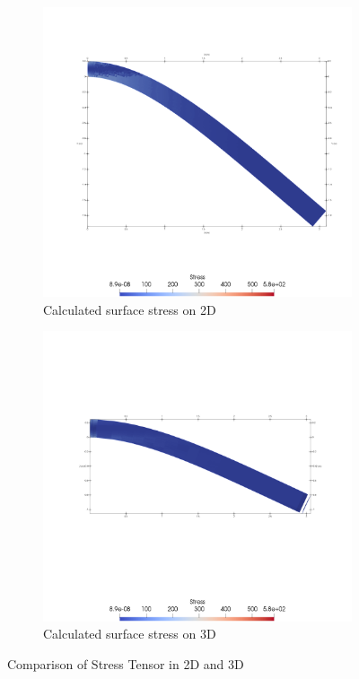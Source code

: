 \documentclass[a4paper,11pt]{article}
\begin{document}
\begin{figure}[h!]
	\begin{subfigure}[b]{0.5\linewidth}
		\centering
		\includegraphics[width=\linewidth]{picture/conference/2dstress1}
		\caption{Calculated surface stress on 2D}
	\end{subfigure}
	\quad
	\begin{subfigure}[b]{0.5\linewidth}
		\centering
		\includegraphics[width=\linewidth]{picture/conference/3dstress1}
		\caption{Calculated surface stress on 3D}
		\label{}
	\end{subfigure}
	\caption{Comparison of Stress Tensor in 2D and 3D}
	\label{fig:comparison}
\end{figure}
\end{document}
